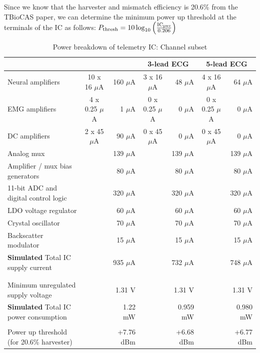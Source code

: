 \documentclass[12pt,onecolumn,titlepage]{article}
\begin{document}
Since we know that the harvester and mismatch efficiency is 20.6\% from the TBioCAS paper, we can determine the minimum power up threshold at the terminals of the IC as follows: $P_{{\rm{thresh}}} = 10 \log_{10} \left( \frac{{\rm{IC_{pwr}}}}{0.206} \right)$

\begin{table}[h]
\scriptsize
\centering
	\caption{Power breakdown of telemetry IC: Channel subset}
	\begin{tabular}{ l c r| c r| c r|}
	& & & \multicolumn{2}{c}{3-lead ECG} & \multicolumn{2}{c}{5-lead ECG} \\ \hline \hline
	Neural amplifiers & 10 x 16 $\mu$A & 160 $\mu$A & 3 x 16 $\mu$A & 48 $\mu$A & 4 x 16 $\mu$A & 64 $\mu$A \\
	EMG amplifiers & 4 x 0.25 $\mu$A & 1 $\mu$A & 0 x 0.25 $\mu$A & 0 $\mu$A & 0 x 0.25 $\mu$A & 0 $\mu$A \\
	DC amplifiers & 2 x 45 $\mu$A & 90 $\mu$A & 0 x 45 $\mu$A & 0 $\mu$A &  0 x 45 $\mu$A & 0 $\mu$A \\
	Analog mux & & 139 $\mu$A & & 139 $\mu$A & & 139 $\mu$A \\
	Amplifier / mux bias generators & & 80 $\mu$A & & 80 $\mu$A & & 80 $\mu$A \\
	11-bit ADC and digital control logic & & 320 $\mu$A & & 320 $\mu$A & & 320 $\mu$A\\
	LDO voltage regulator & & 60 $\mu$A & & 60 $\mu$A & & 60 $\mu$A \\
	Crystal oscillator & & 70 $\mu$A & & 70 $\mu$A & & 70 $\mu$A \\
	Backscatter modulator & & 15 $\mu$A & & 15 $\mu$A & & 15 $\mu$A \\
	\hline
	{\bf{Simulated}} Total IC supply current & & 935 $\mu$A & & 732 $\mu$A & & 748 $\mu$A \\
	& & & & & & \\
	& & & & & & \\
	Minimum unregulated supply voltage & & 1.31 V & & 1.31 V & & 1.31 V \\
	{\bf{Simulated}} Total IC power consumption & & 1.22 mW & & 0.959 mW & & 0.980 mW \\
	& & & & & & \\
	Power up threshold (for 20.6\% harvester) & & +7.76 dBm & & +6.68 dBm & & +6.77 dBm \\
	\end{tabular}
\label{tab:IC_pwr_breakdown}
\end{table}
\end{document}
